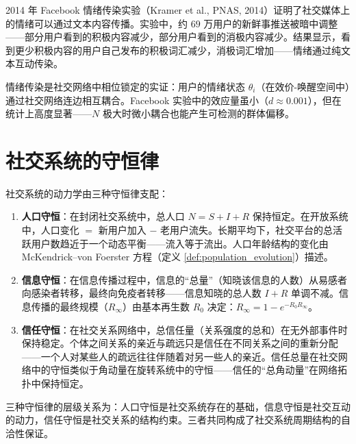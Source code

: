 \begin{example}[社交网络中的情绪传染]
2014 年 Facebook 情绪传染实验（Kramer et al., PNAS, 2014）证明了社交媒体上的情绪可以通过文本内容传播。实验中，约 $69$ 万用户的新鲜事推送被暗中调整——部分用户看到的积极内容减少，部分用户看到的消极内容减少。结果显示，看到更少积极内容的用户自己发布的积极词汇减少，消极词汇增加——情绪通过纯文本互动传染。

情绪传染是社交网络中相位锁定的实证：用户的情绪状态 $\theta_i$（在效价-唤醒空间中）通过社交网络连边相互耦合。Facebook 实验中的效应量虽小（$d \approx 0.001$），但在统计上高度显著——$N$ 极大时微小耦合也能产生可检测的群体偏移。
\end{example}

\section{社交系统的守恒律}

\begin{theorem}[社交系统的三种守恒律]\label{thm:social_conservation}
社交系统的动力学由三种守恒律支配：
\begin{enumerate}[label=(\roman*)]
    \item \textbf{人口守恒}：在封闭社交系统中，总人口 $N = S + I + R$ 保持恒定。在开放系统中，人口变化 $=$ 新用户加入 $-$ 老用户流失。长期平均下，社交平台的总活跃用户数趋近于一个动态平衡——流入等于流出。人口年龄结构的变化由 McKendrick–von Foerster 方程（定义 \ref{def:population_evolution}）描述。
    \item \textbf{信息守恒}：在信息传播过程中，信息的“总量”（知晓该信息的人数）从易感者向感染者转移，最终向免疫者转移——信息知晓的总人数 $I + R$ 单调不减。信息传播的最终规模（$R_{\infty}$）由基本再生数 $R_0$ 决定：$R_{\infty} = 1 - e^{-R_0 R_{\infty}}$。
    \item \textbf{信任守恒}：在社交关系网络中，总信任量（关系强度的总和）在无外部事件时保持稳定。个体之间关系的亲近与疏远只是信任在不同关系之间的重新分配——一个人对某些人的疏远往往伴随着对另一些人的亲近。信任总量在社交网络中的守恒类似于角动量在旋转系统中的守恒——信任的“总角动量”在网络拓扑中保持恒定。
\end{enumerate}
三种守恒律的层级关系为：人口守恒是社交系统存在的基础，信息守恒是社交互动的动力，信任守恒是社交关系的结构约束。三者共同构成了社交系统周期结构的自洽性保证。
\end{theorem}

